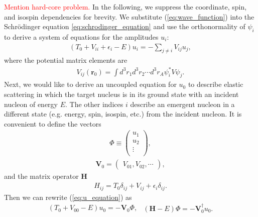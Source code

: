 \documentclass[preprintnumbers,floatfix,aps,prc,preprint,nofootinbib]{revtex4-1}
\begin{document}
\textcolor{red}{Mention hard-core problem.} In the following, we suppress the coordinate, spin, and isospin dependencies for brevity. We substitute (\ref{eq:wave_function}) into the Schr\"odinger equation \ref{eq:schrodinger_equation} and use the orthonormality of $\psi_i$ to derive a system of equations for the amplitudes $u_i$:
%
\begin{eqnarray}
	\label{eq:u_equation}
	(T_0 + V_{ii} + \epsilon_i - E) u_i = - \sum_{j \neq i} V_{ij} u_j,
\end{eqnarray}
%
where the potential matrix elements are
%
\begin{eqnarray}
	\label{eq:potential_matrix_elements}
	V_{ij}(\textbf{r}_0) = \int{d^3 r_1 d^3 r_2 \cdots d^3 r_A \psi_i^* V \psi_j}.
\end{eqnarray}
%
Next, we would like to derive an uncoupled equation for $u_0$ to describe elastic scattering in which the target nucleus is in its ground state with an incident nucleon of energy $E$. The other indices $i$ describe an emergent nucleon in a different state (e.g. energy, spin, isospin, etc.) from the incident nucleon. It is convenient to define the vectors
%
\begin{eqnarray}
	\label{eq:u_vector}
	\Phi \equiv
	\begin{pmatrix}
		u_1 \\
		u_2 \\
		\vdots \\
	\end{pmatrix}
	,
\end{eqnarray}
%
\begin{eqnarray}
	\label{eq:potential_vector}
	\textbf{V}_0 =
	\begin{pmatrix}
		V_{01}, V_{02}, \cdots
	\end{pmatrix}
	,
\end{eqnarray}
%
and the matrix operator $\textbf{H}$
%
\begin{eqnarray}
	\label{eq:hamiltonian_operator}
	H_{ij} = T_0 \delta_{ij} + V_{ij} + \epsilon_i \delta_{ij}.
\end{eqnarray}
%
Then we can rewrite (\ref{eq:u_equation}) as
%
\begin{subequations}
	\label{eq:u_vector_equation}
	\begin{eqnarray}
		\label{eq:u_vector_equation_a}
		(T_0 + V_{00} - E) u_0 = -\textbf{V}_0 \Phi,
	\end{eqnarray}
	\begin{eqnarray}
		\label{eq:u_vector_equation_b}
		(\textbf{H}-E) \Phi = -\textbf{V}_0^{\dagger} u_0.
	\end{eqnarray}
\end{subequations}
\end{document}
